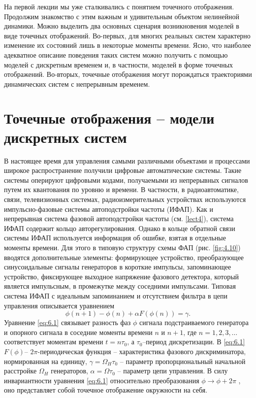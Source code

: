 На первой лекции мы уже сталкивались с понятием точечного
отображения. Продолжим знакомство с этим важным и удивительным
объектом нелинейной динамики. Можно выделить два основных сценария
возникновения моделей в виде точечных отображений. Во-первых, для многих
реальных систем характерно изменение их состояний лишь в некоторые
моменты времени. Ясно, что наиболее адекватное описание поведения таких
систем можно получить с помощью моделей с дискретным временем и, в
частности, моделей в форме точечных отображений. Во-вторых, точечные
отображения могут порождаться траекториями динамических систем с
непрерывным временем.

\section{Точечные отображения -- модели дискретных систем}%
\label{sec:6.1}

В настоящее время для управления самыми различными объектами и
процессами широкое распространение получили цифровые автоматические
системы. Такие системы оперируют цифровыми кодами, получаемыми из
непрерывных сигналов путем их квантования по уровню и времени. В
частности, в радиоавтоматике, связи, телевизионных системах,
радиоизмерительных устройствах используются импульсно-фазовые системы
автоподстройки частоты (ИФАП). Как и непрерывная система фазовой
автоподстройки частоты (см. \ref{lect4}), система ИФАП содержит кольцо
авторегулирования. Однако в кольце обратной связи системы ИФАП
используется информация об ошибке, взятая в отдельные моменты времени.
Для этого в типовую структуру схемы ФАП (рис. \ref{fig:4.10}) вводятся
дополнительные элементы: формирующее устройство, преобразующее
синусоидальные сигналы генераторов в короткие импульсы, запоминающее
устройство, фиксирующее выходное напряжение фазового детектора, который
является импульсным, в промежутке между соседними импульсами. Типовая
система ИФАП с идеальным запоминанием и отсутствием фильтра в цепи
управления описывается уравнением
\begin{equation}
        \label{eq:6.1}
        \phi(n+1) - \phi(n) + \alpha F( \phi(n)) = \gamma.
\end{equation}
Уравнение \eqref{eq:6.1} связывает разность фаз $\phi$ сигнала подстраиваемого генератора
и опорного сигнала в соседние моменты времени $n$ и $n+1$, где $n = 1,2,3,\dots$
соответствует моментам времени $t=n \tau_0$, а $\tau_0$--период дискретизации.
В \eqref{eq:6.1} $F( \phi)$-- $2 \pi$-периодическая функция --
 характеристика фазового дискриминатора,
нормированная на единицу,
$\gamma = \Omega_H \tau_0$
-- параметр пропорциональный
начальной расстройке
$\Omega_H$ генераторов, $\alpha = \Omega \tau_0$
-- параметр цепи управления.
В силу инвариантности уравнения \eqref{eq:6.1} относительно преобразования
$\phi \to \phi + 2 \pi$ , оно представляет собой точечное отображение окружности на
себя.

